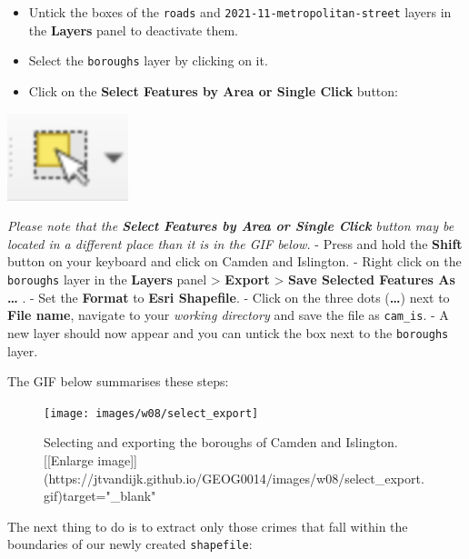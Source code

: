 \documentclass[
]{book}
\providecommand{\tightlist}{%
  \setlength{\itemsep}{0pt}\setlength{\parskip}{0pt}}
\begin{document}
\begin{itemize}
\tightlist
\item
  Untick the boxes of the \texttt{roads} and \texttt{2021-11-metropolitan-street} layers in the \textbf{Layers} panel to deactivate them.
\item
  Select the \texttt{boroughs} layer by clicking on it.
\item
  Click on the \textbf{Select Features by Area or Single Click} button:
\end{itemize}

\begin{center}\includegraphics[width=1.39in]{images/w08/select} \end{center}

\emph{Please note that the \textbf{Select Features by Area or Single Click} button may be located in a different place than it is in the GIF below.}
- Press and hold the \textbf{Shift} button on your keyboard and click on Camden and Islington.
- Right click on the \texttt{boroughs} layer in the \textbf{Layers} panel \textgreater{} \textbf{Export} \textgreater{} \textbf{Save Selected Features As \ldots{} }.
- Set the \textbf{Format} to \textbf{Esri Shapefile}.
- Click on the three dots (\textbf{\ldots{}}) next to \textbf{File name}, navigate to your \emph{working directory} and save the file as \texttt{cam\_is}.
- A new layer should now appear and you can untick the box next to the \texttt{boroughs} layer.

The GIF below summarises these steps:

\begin{figure}

{\centering \texttt{[image: images/w08/select\_export]} 

}

\caption{Selecting and exporting the boroughs of Camden and Islington. [[Enlarge image]](https://jtvandijk.github.io/GEOG0014/images/w08/select_export.gif){target="_blank"}}\label{fig:select-boroughs}
\end{figure}

The next thing to do is to extract only those crimes that fall within the boundaries of our newly created \texttt{shapefile}:
\end{document}
